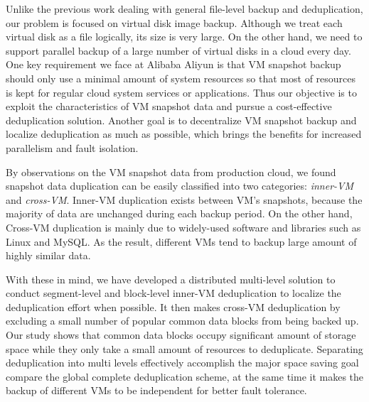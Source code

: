 Unlike the previous work dealing with general file-level backup and deduplication, our problem is focused on 
virtual disk image backup. Although we treat each virtual disk  as a file logically, its size is very large.
On the other hand, we need to support parallel backup of a large number of virtual disks in a cloud every day. 
One key requirement we face at Alibaba Aliyun is that VM snapshot backup should only use a minimal amount of system
resources so that most of resources is kept for regular cloud system services or applications.
Thus our objective is to exploit the characteristics of VM snapshot data and
pursue a cost-effective deduplication solution. 
Another goal  is to decentralize VM snapshot backup and  localize  deduplication as much as possible,
which brings the benefits for increased parallelism  and fault isolation.

By observations on the VM snapshot data from production cloud, we found snapshot data duplication 
can be easily classified into two categories: \emph{inner-VM} and \emph{cross-VM}. Inner-VM duplication
exists between VM's snapshots, because the majority of data are unchanged during each backup period. 
On the other hand, Cross-VM duplication is mainly due to widely-used software and libraries such as Linux and MySQL.
As the result, different VMs tend to backup large amount of highly similar data.

With these in mind, we  have developed a distributed multi-level solution to conduct 
segment-level  and block-level inner-VM  deduplication to localize the deduplication effort when possible.
It then makes cross-VM deduplication by excluding a small number of
popular common data blocks from being backed up. Our study shows that common data blocks
occupy significant amount of storage space while they only take
a small amount of resources to deduplicate.
Separating deduplication into multi levels effectively accomplish the major space saving goal
compare the global complete deduplication scheme, at the same time it makes
the backup of different VMs to be independent for better fault tolerance.


